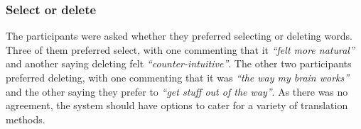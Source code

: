 \subsubsection{Select or delete}
The participants were asked whether they preferred selecting or deleting words. Three of them preferred select, with
one commenting that it \textit{``felt more natural''} and another saying deleting felt \textit{``counter-intuitive''}.
The other two participants preferred deleting, with one commenting that it was \textit{``the way my brain works''} and
the other saying they prefer to \textit{``get stuff out of the way''}. As there was no agreement, the system should
have options to cater for a variety of translation methods.












